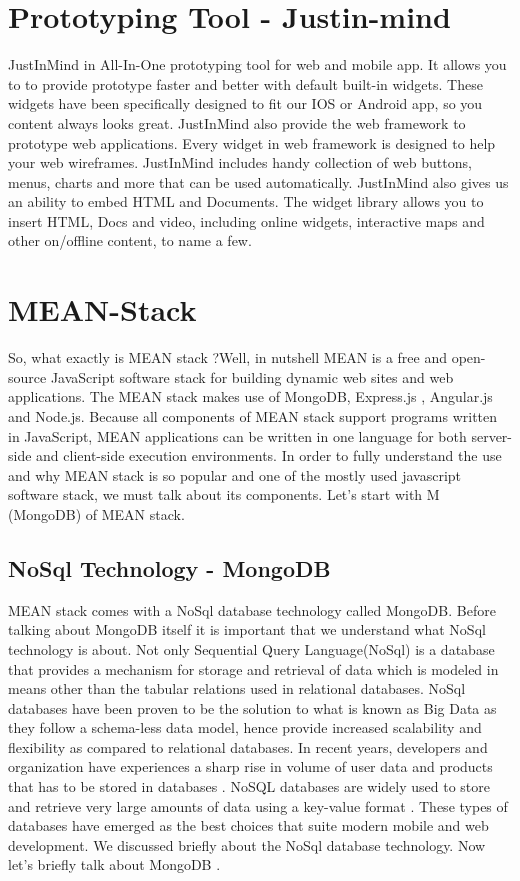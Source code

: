 	\section{Prototyping Tool - Justin-mind}
	 JustInMind  in All-In-One prototyping tool for web and mobile app. \cite{JustInMind} It allows you to to provide prototype faster and better with default built-in widgets. These widgets have been specifically designed to fit our IOS or Android app, so you content always looks great.  JustInMind also provide the web framework to prototype web applications. Every widget in web framework is designed to help your web wireframes. JustInMind includes handy collection of web buttons, menus, charts  and more that can be used automatically.  JustInMind also gives us an ability to embed HTML and Documents. The widget library allows you to insert HTML, Docs and video, including online widgets, interactive maps and other on/offline content, to name a few. 
	 
	\section{MEAN-Stack}
	So, what exactly is MEAN stack ?Well, in nutshell \cite{Mean-Stack} MEAN is a free and open-source JavaScript software stack for building dynamic web sites and web applications. The MEAN stack makes use of MongoDB, Express.js , Angular.js and Node.js. Because all components of MEAN stack support programs written in JavaScript, MEAN applications can be written in one language for both server-side and  client-side execution environments. In order to fully understand the use and why MEAN stack is so popular and one of the mostly used javascript software stack, we must talk about its components. Let's start with M (MongoDB) of MEAN stack.
	
		\subsection{NoSql Technology - MongoDB}
		MEAN stack comes with a NoSql database technology called MongoDB. Before talking about MongoDB itself it is important that we understand what NoSql technology is about. \cite{NoSqlTechnology}  Not only Sequential Query Language(NoSql) is a database that provides a mechanism for storage and retrieval of data which is modeled in means other than the tabular relations used in relational databases. NoSql databases have been proven to be the solution to what is known as Big Data as they follow a schema-less data model, hence provide increased scalability and flexibility as compared to relational databases. In recent years, developers and organization have experiences a sharp rise in volume of user data and products that has to be stored in databases \cite{MongoOfficial}. NoSQL databases are widely used to store and retrieve very large amounts of data using a key-value format \cite{VeronikaAbramova}. These types of databases have emerged as the best choices that suite modern mobile and web development.
		We discussed briefly about the NoSql database technology. Now let's briefly talk about MongoDB .
		
